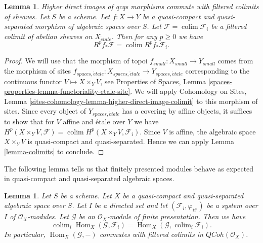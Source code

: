 \documentclass{stacks-project}
\newenvironment{slogan}{\comment}{\endcomment}
\theoremstyle{plain}
\newtheorem{lemma}[subsection]{Lemma}
\theoremstyle{definition}
\theoremstyle{remark}
\numberwithin{equation}{subsection}
\def\colim{\mathop{\mathrm{colim}}\nolimits}
\def\Hom{\mathop{\mathrm{Hom}}\nolimits}
\def\etale{{\acute{e}tale}}
\def\QCoh{\mathit{QCoh}}
\begin{document}
\begin{lemma}
\label{lemma-colimit-cohomology}
\begin{slogan}
Higher direct images of qcqs morphisms commute with filtered colimits
of sheaves.
\end{slogan}
Let $S$ be a scheme. Let $f : X \to Y$ be a quasi-compact and quasi-separated
morphism of algebraic spaces over $S$. Let $\mathcal{F} = \colim \mathcal{F}_i$
be a filtered colimit of abelian sheaves on $X_\etale$.
Then for any $p \geq 0$ we have
$$
R^pf_*\mathcal{F} = \colim R^pf_*\mathcal{F}_i.
$$
\end{lemma}

\begin{proof}
We will use that the morphism of topoi $f_{small} : X_{small} \to Y_{small}$
comes from the morphism of sites
$f_{spaces, \etale} : X_{spaces, \etale} \to Y_{spaces, \etale}$
corresponding to the continuous functor $V \longmapsto X \times_Y V$,
see Properties of Spaces, Lemma
\ref{spaces-properties-lemma-functoriality-etale-site}.
We will apply Cohomology on Sites, Lemma
\ref{sites-cohomology-lemma-higher-direct-image-colimit}
to this morphism of sites. Since every object of $Y_{spaces, \etale}$
has a covering by affine objects, it suffices to show that
for $V$ affine and \'etale over $Y$ we have
$H^p(X \times_Y V, \mathcal{F}) = \colim H^p(X \times_Y V, \mathcal{F}_i)$.
Since $V$ is affine, the algebraic space $X \times_Y V$ is
quasi-compact and quasi-separated.
Hence we can apply Lemma \ref{lemma-colimits}
to conclude.
\end{proof}

\noindent
The following lemma tells us that finitely presented modules behave
as expected in quasi-compact and quasi-separated algebraic spaces.

\begin{lemma}
\label{lemma-finite-presentation-quasi-compact-colimit}
Let $S$ be a scheme. Let $X$ be a quasi-compact and quasi-separated
algebraic space over $S$. Let $I$ be a directed set and
let $(\mathcal{F}_i, \varphi_{ii'})$ be a system over $I$
of $\mathcal{O}_X$-modules. Let $\mathcal{G}$ be an
$\mathcal{O}_X$-module of finite presentation. Then we have
$$
\colim_i \Hom_X(\mathcal{G}, \mathcal{F}_i)
=
\Hom_X(\mathcal{G}, \colim_i \mathcal{F}_i).
$$
In particular, $\Hom_X(\mathcal{G}, -)$ commutes with filtered
colimits in $\QCoh(\mathcal{O}_X)$.
\end{lemma}
\end{document}
